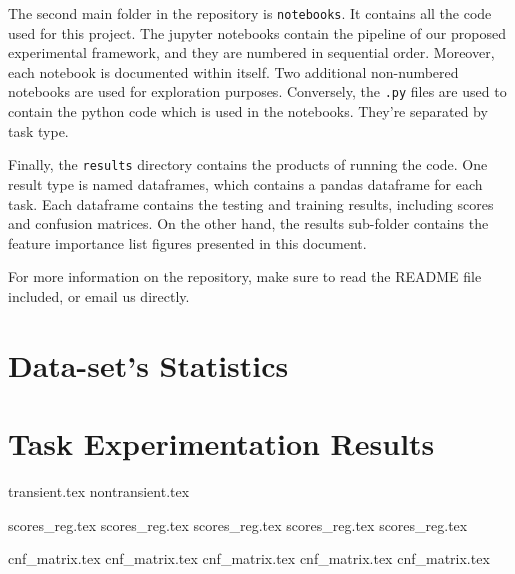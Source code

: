 \documentclass[a4paper,fleqn,usenatbib]{mnras}
\begin{document}
The second main folder in the repository is \texttt{notebooks}. It contains all the code used for this project. The jupyter notebooks contain the pipeline of our proposed experimental framework, and they are numbered in sequential order. Moreover, each notebook is documented within itself. Two additional non-numbered notebooks are used for exploration purposes. Conversely, the \texttt{.py} files are used to contain the python code which is used in the notebooks. They're separated by task type.

Finally, the \texttt{results} directory contains the products of running the code. One result type is named dataframes, which contains a pandas dataframe for each task. Each dataframe contains the testing and training results, including scores and confusion matrices.  On the other hand, the results sub-folder contains the feature importance list figures presented in this document.

For more information on the repository, make sure to read the README file included, or email us directly.

\section{Data-set's Statistics}
\section{Task Experimentation Results}

\newpage
\pagebreak

{transient.tex}
{nontransient.tex}

{scores_reg.tex}
{scores_reg.tex}
{scores_reg.tex}
{scores_reg.tex}
{scores_reg.tex}

{cnf_matrix.tex}
{cnf_matrix.tex}
{cnf_matrix.tex}
{cnf_matrix.tex}
{cnf_matrix.tex}




\label{lastpage}
\end{document}
